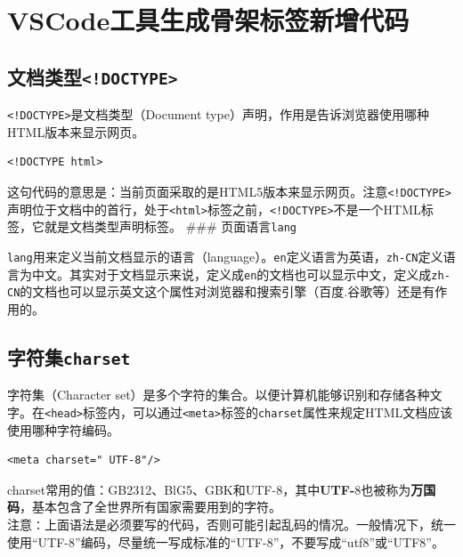 \documentclass[
]{book}
\begin{document}
\hypertarget{vscodeux5de5ux5177ux751fux6210ux9aa8ux67b6ux6807ux7b7eux65b0ux589eux4ee3ux7801}{%
\section{VSCode工具生成骨架标签新增代码}\label{vscodeux5de5ux5177ux751fux6210ux9aa8ux67b6ux6807ux7b7eux65b0ux589eux4ee3ux7801}}

\hypertarget{ux6587ux6863ux7c7bux578bdoctype}{%
\subsection{\texorpdfstring{文档类型\texttt{\textless{}!DOCTYPE\textgreater{}}}{文档类型\textless!DOCTYPE\textgreater{}}}\label{ux6587ux6863ux7c7bux578bdoctype}}

\texttt{\textless{}!DOCTYPE\textgreater{}}是文档类型（Document type）声明，作用是告诉浏览器使用哪种HTML版本来显示网页。

\begin{verbatim}
<!DOCTYPE html>
\end{verbatim}

这句代码的意思是：当前页面采取的是HTML5版本来显示网页。注意\texttt{\textless{}!DOCTYPE\textgreater{}}声明位于文档中的首行，处于\texttt{\textless{}html\textgreater{}}标签之前，\texttt{\textless{}!DOCTYPE\textgreater{}}不是一个HTML标签，它就是文档类型声明标签。
\#\#\# 页面语言\texttt{lang}

\texttt{lang}用来定义当前文档显示的语言（language）。\texttt{en}定义语言为英语，\texttt{zh-CN}定义语言为中文。其实对于文档显示来说，定义成\texttt{en}的文档也可以显示中文，定义成\texttt{zh-CN}的文档也可以显示英文这个属性对浏览器和搜索引擎（百度.谷歌等）还是有作用的。

\hypertarget{ux5b57ux7b26ux96c6charset}{%
\subsection{\texorpdfstring{字符集\texttt{charset}}{字符集charset}}\label{ux5b57ux7b26ux96c6charset}}

字符集（Character set）是多个字符的集合。以便计算机能够识别和存储各种文字。在\texttt{\textless{}head\textgreater{}}标签内，可以通过\texttt{\textless{}meta\textgreater{}}标签的\texttt{charset}属性来规定HTML文档应该使用哪种字符编码。

\begin{verbatim}
<meta charset=" UTF-8"/>
\end{verbatim}

charset常用的值：GB2312、BlG5、GBK和UTF-8，其中\textbf{UTF-}8也被称为\textbf{万国码}，基本包含了全世界所有国家需要用到的字符。\\
注意∶上面语法是必须要写的代码，否则可能引起乱码的情况。一般情况下，统一使用``UTF-8''编码，尽量统一写成标准的``UTF-8''，不要写成``utf8''或``UTF8''。
\end{document}
